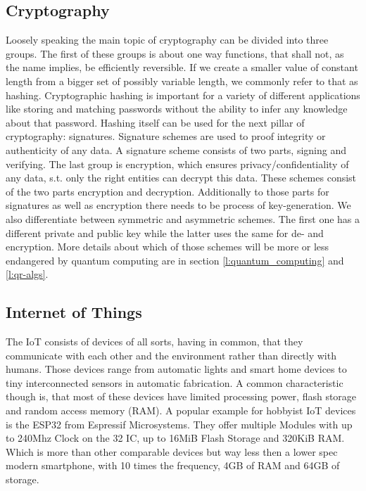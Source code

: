 \documentclass[conference]{IEEEtran}
\newcommand{\comment}[1]{}
\begin{document}
\subsection{Cryptography}
Loosely speaking the main topic of cryptography can be divided into three groups.
The first of these groups is about one way functions, that shall not, as the name implies, be efficiently reversible.
If we create a smaller value of constant length from a bigger set of possibly variable length, we commonly refer to that as hashing.
Cryptographic hashing is important for a variety of different applications like storing and matching passwords without the ability to infer any knowledge about that password.
Hashing itself can be used for the next pillar of cryptography: signatures.
Signature schemes are used to proof integrity or authenticity of any data.
A signature scheme consists of two parts, signing and verifying. 
The last group is encryption, which ensures privacy/confidentiality of any data, s.t. only the right entities can decrypt this data.
These schemes consist of the two parts encryption and decryption.
Additionally to those parts for signatures as well as encryption there needs to be process of key-generation.
We also differentiate between symmetric and asymmetric schemes. The first one has a different private and public key while the latter uses the same for de- and encryption.
More details about which of those schemes will be more or less endangered by quantum computing are in section \ref{l:quantum_computing} and \ref{l:qr-algs}.

\subsection{Internet of Things}
\comment{ %
- growing: over 3 billion rn \cite{QR_IoT}
} %

The IoT consists of devices of all sorts, having in common, that they communicate with each other and the environment rather than directly with humans.
Those devices range from automatic lights and smart home devices to tiny interconnected sensors in automatic fabrication.
A common characteristic though is, that most of these devices have limited processing power, flash storage and random access memory (RAM). 
A popular example for hobbyist IoT devices is the ESP32 from Espressif Microsystems.
They offer multiple Modules with up to 240Mhz Clock on the 32 IC, up to 16MiB Flash Storage and 320KiB RAM.
Which is more than other comparable devices but way less then a lower spec modern smartphone, with 10 times the frequency, 4GB of RAM and 64GB of storage.
\end{document}
